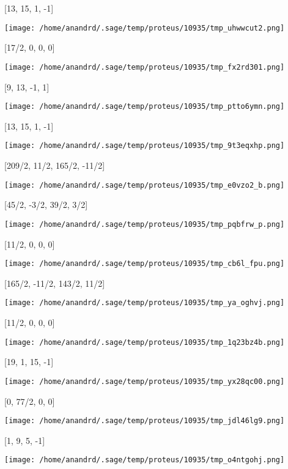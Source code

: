 \documentclass[11pt]{article}
\begin{document}
[13, 15, 1, -1]
\begin{center}
\texttt{[image: /home/anandrd/.sage/temp/proteus/10935/tmp\_uhwwcut2.png]}
\end{center}
[17/2, 0, 0, 0]
\begin{center}
\texttt{[image: /home/anandrd/.sage/temp/proteus/10935/tmp\_fx2rd301.png]}
\end{center}
[9, 13, -1, 1]
\begin{center}
\texttt{[image: /home/anandrd/.sage/temp/proteus/10935/tmp\_ptto6ymn.png]}
\end{center}
[13, 15, 1, -1]
\begin{center}
\texttt{[image: /home/anandrd/.sage/temp/proteus/10935/tmp\_9t3eqxhp.png]}
\end{center}
[209/2, 11/2, 165/2, -11/2]
\begin{center}
\texttt{[image: /home/anandrd/.sage/temp/proteus/10935/tmp\_e0vzo2\_b.png]}
\end{center}
[45/2, -3/2, 39/2, 3/2]
\begin{center}
\texttt{[image: /home/anandrd/.sage/temp/proteus/10935/tmp\_pqbfrw\_p.png]}
\end{center}
[11/2, 0, 0, 0]
\begin{center}
\texttt{[image: /home/anandrd/.sage/temp/proteus/10935/tmp\_cb6l\_fpu.png]}
\end{center}
[165/2, -11/2, 143/2, 11/2]
\begin{center}
\texttt{[image: /home/anandrd/.sage/temp/proteus/10935/tmp\_ya\_oghvj.png]}
\end{center}
[11/2, 0, 0, 0]
\begin{center}
\texttt{[image: /home/anandrd/.sage/temp/proteus/10935/tmp\_1q23bz4b.png]}
\end{center}
[19, 1, 15, -1]
\begin{center}
\texttt{[image: /home/anandrd/.sage/temp/proteus/10935/tmp\_yx28qc00.png]}
\end{center}
[0, 77/2, 0, 0]
\begin{center}
\texttt{[image: /home/anandrd/.sage/temp/proteus/10935/tmp\_jdl46lg9.png]}
\end{center}
[1, 9, 5, -1]
\begin{center}
\texttt{[image: /home/anandrd/.sage/temp/proteus/10935/tmp\_o4ntgohj.png]}
\end{center}
\end{document}

